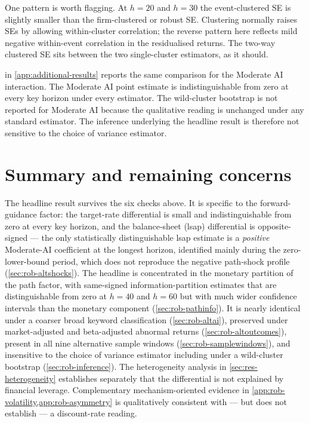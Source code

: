 One pattern is worth flagging. At $h = 20$ and $h = 30$ the
event-clustered SE is slightly smaller than the firm-clustered or
robust SE. Clustering normally raises SEs by allowing within-cluster
correlation; the reverse pattern here reflects mild negative
within-event correlation in the residualised returns. The two-way
clustered SE sits between the two single-cluster estimators, as it
should.

 in \cref{app:additional-results}
reports the same comparison for the Moderate AI interaction. The
Moderate AI point estimate is indistinguishable from zero at every
key horizon under every estimator. The wild-cluster bootstrap is not
reported for Moderate AI because the qualitative reading is unchanged
under any standard estimator. The inference underlying the headline
result is therefore not sensitive to the choice of variance
estimator.

\section{Summary and remaining concerns}
\label{sec:rob-lp}

The headline result survives the six checks above. It is specific
to the forward-guidance factor: the target-rate differential is
small and indistinguishable from zero at every key horizon, and
the balance-sheet (lsap) differential is opposite-signed --- the
only statistically distinguishable lsap estimate is a \emph{positive}
Moderate-AI coefficient at the longest horizon, identified mainly
during the zero-lower-bound period, which does not reproduce the
negative path-shock profile (\cref{sec:rob-altshocks}). The
headline is concentrated in the monetary partition of the path
factor, with same-signed information-partition estimates that are
distinguishable from zero at $h = 40$ and $h = 60$ but with much
wider confidence intervals than the monetary component
(\cref{sec:rob-pathinfo}). It is nearly identical under a coarser
broad keyword classification (\cref{sec:rob-altai}), preserved
under market-adjusted and beta-adjusted abnormal returns
(\cref{sec:rob-altoutcomes}), present in all nine alternative
sample windows (\cref{sec:rob-samplewindows}), and insensitive to
the choice of variance estimator including under a wild-cluster
bootstrap (\cref{sec:rob-inference}). The heterogeneity analysis in
\cref{sec:res-heterogeneity} establishes separately that the
differential is not explained by financial leverage. Complementary
mechanism-oriented evidence in
\cref{app:rob-volatility,app:rob-asymmetry} is qualitatively
consistent with --- but does not establish --- a discount-rate
reading.

